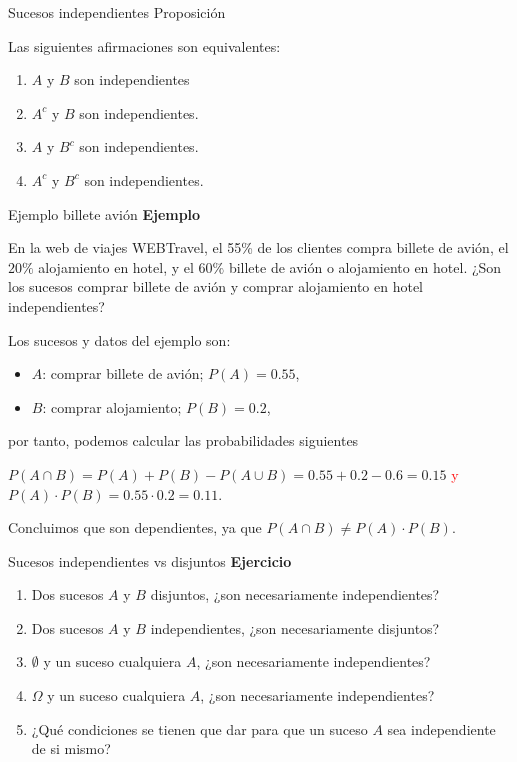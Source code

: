 \documentclass[
  ignorenonframetext,
  aspectratio=169]{beamer}
\providecommand{\tightlist}{%
  \setlength{\itemsep}{0pt}\setlength{\parskip}{0pt}}\usepackage{longtable,booktabs,array}
\newcommand\red[1]{\textcolor{red}{#1}}
\begin{document}
\begin{frame}{Sucesos independientes}
\label{sucesos-independientes-2}
Proposición

Las siguientes afirmaciones son equivalentes:

\begin{enumerate}
\tightlist
\item
  \(A\) y \(B\) son independientes
\item
  \(A^c\) y \(B\) son independientes.
\item
  \(A\) y \(B^c\) son independientes.
\item
  \(A^c\) y \(B^c\) son independientes.
\end{enumerate}
\end{frame}

\begin{frame}{Ejemplo billete avión}
\label{ejemplo-billete-aviuxf3n}
\textbf{Ejemplo}

En la web de viajes WEBTravel, el 55\% de los clientes compra billete de
avión, el \(20\%\) alojamiento en hotel, y el \(60\%\) billete de avión
o alojamiento en hotel. ¿Son los sucesos comprar billete de avión y
comprar alojamiento en hotel independientes?

Los sucesos y datos del ejemplo son:

\begin{itemize}
\tightlist
\item
  \(A\): comprar billete de avión; \(P(A)=0.55\),
\item
  \(B\): comprar alojamiento; \(P(B)=0.2\),
\end{itemize}

por tanto, podemos calcular las probabilidades siguientes

\(P(A\cap B)=P(A)+P(B)-P(A\cup B)=0.55+0.2-0.6=0.15\) \red{y}
\(P(A)\cdot P(B) = 0.55\cdot 0.2=0.11.\)

Concluimos que son dependientes, ya que
\(P(A\cap B)\neq P(A)\cdot P(B)\).
\end{frame}

\begin{frame}{Sucesos independientes vs disjuntos}
\label{sucesos-independientes-vs-disjuntos}
\textbf{Ejercicio}

\begin{enumerate}
\tightlist
\item
  Dos sucesos \(A\) y \(B\) disjuntos, ¿son necesariamente
  independientes?
\item
  Dos sucesos \(A\) y \(B\) independientes, ¿son necesariamente
  disjuntos?
\item
  \(\emptyset\) y un suceso cualquiera \(A\), ¿son necesariamente
  independientes?
\item
  \(\Omega\) y un suceso cualquiera \(A\), ¿son necesariamente
  independientes?
\item
  ¿Qué condiciones se tienen que dar para que un suceso \(A\) sea
  independiente de si mismo?
\end{enumerate}
\end{frame}
\end{document}

